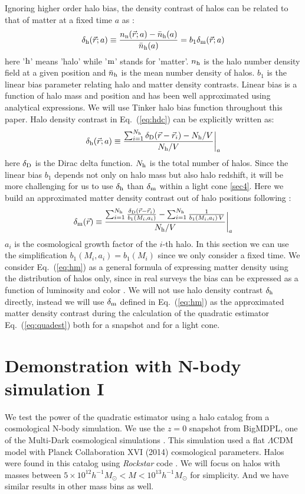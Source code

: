 \documentclass[prd,amsmath,amssymb,floatfix,superscriptaddress,nofootinbib,twocolumn]{revtex4-1}
\def\be{\begin{equation}}
\def\ee{\end{equation}}
\newcommand{\vrr}{\vec{r}}
\newcommand{\ec}[1]{Eq.~(\ref{eq:#1})}
\newcommand{\eql}[1]{\label{eq:#1}}
\begin{document}
Ignoring higher order halo bias, the density contrast of halos can be related to that of matter at a fixed time $a$ as \cite{Desjacques:2018rev}:
\be 
\delta_{\rm h}(\vrr;a) \equiv \frac{n_{\rm n}(\vrr;a)-\bar{n}_{\rm h}(a)}{\bar{n}_{\rm h}(a)}=b_{1}\delta_{\rm m}(\vrr;a) \eql{hdc}
\ee 
here '$\rm h$' means 'halo' while '$\rm m$' stands for 'matter'. $n_{\rm h}$ is the halo number density field at a given position and $\bar{n}_{\rm h}$ is the mean number density of halos. $b_{1}$ is the linear bias parameter relating halo and matter density contrasts. Linear bias is a function of halo mass and position and has been well approximated using analytical expressions\cite{Seljak:2004SW}\cite{Bhattacharya:2011MF}. We will use Tinker halo bias function throughout this paper\cite{Tinker:2010Tinker}. Halo density contrast in \ec{hdc} can be explicitly written as:
\be 
\delta_{\rm h}(\vrr;a) \equiv \frac{\sum_{i=1}^{N_{\rm h}}\delta_{\rm D}(\vrr-\vrr_{i})-N_{\rm h}/V}{N_{\rm h}/V}\bigg|_{a}
\ee 
here $\delta_{\rm D}$ is the Dirac delta function. $N_{\rm h}$ is the total number of halos. Since the linear bias $b_1$ depends not only on halo mass but also halo redshift, it will be more challenging for us to use $\delta_{\rm h}$ than $\delta_{\rm m}$ within a light cone \ref{sec4}. Here we build an approximated matter density contrast out of halo positions following \cite{Pervical:2007GPS}:
\be 
\delta_{\rm m}(\vrr) \equiv \frac{\sum_{i=1}^{N_{\rm h}}\frac{\delta_{\rm D}(\vrr-\vrr_{i})}{b_{1}(M_{i},a_{i})}-\sum_{i=1}^{N_{\rm h}}\frac{1}{b_{1}(M_{i},a_{i})\,V}}{N_{\rm h}/V}\bigg|_{a} \eql{hm}
\ee 
$a_{i}$ is the cosmological growth factor of the $i$-th halo. In this section we can use the simplification $b_{1}(M_{i},a_{i})=b_{1}(M_i)$ since we only consider a fixed time. We consider \ec{hm} as a general formula of expressing matter density using the distribution of halos only, since in real surveys the bias can be expressed as a function of luminosity and color \cite{Cresswell:2008Col}. We will not use halo density contrast $\delta_{\rm h}$ directly, instead we will use $\delta_{\rm m}$ defined in \ec{hm} as the approximated matter density contrast during the calculation of the quadratic estimator \ec{quadest} both for a snapshot and for a light cone.

\section{Demonstration with N-body simulation I} \label{sec3}
\noindent We test the power of the quadratic estimator using a halo catalog from a cosmological N-body simulation. We use the $z=0$ snapshot from BigMDPL, one of the Multi-Dark cosmological simulations \cite{Klypin:2014nov}. This simulation used a flat $\Lambda$CDM model with Planck Collaboration XVI (2014) \cite{Planck:2014cos} cosmological parameters. Halos were found in this catalog using \textit{Rockstar} code \cite{Behroozi:2013Rock}. We will focus on halos with masses between $5 \times 10^{12}h^{-1}M_{\odot}<M < 10^{13}h^{-1}M_{\odot}$ for simplicity. And we have similar results in other mass bins as well.
\end{document}
